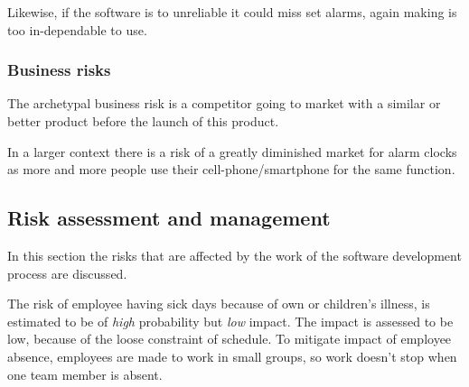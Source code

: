 \documentclass[Main]{subfiles}
\begin{document}
		Likewise, if the software is to unreliable it could miss set alarms, again making is too in-dependable to use.



		\subsubsection{Business risks} %
		\label{sub:business_risks}

		The archetypal business risk is a competitor going to market with a similar or better product before the launch of this product.

		In a larger context there is a risk of a greatly diminished market for alarm clocks as more and more people use their cell-phone/smartphone for the same function.






	\subsection{Risk assessment and management} %
	\label{sub:risk_assessment_and_management}

	In this section the risks that are affected by the work of the software development process are discussed.

	The risk of employee having sick days because of own or children's illness, is estimated to be of \emph{high} probability but \emph{low} impact.
	The impact is assessed to be low, because of the loose constraint of schedule.
	To mitigate impact of employee absence, employees are made to work in small groups, so work doesn't stop when one team member is absent.
\end{document}
